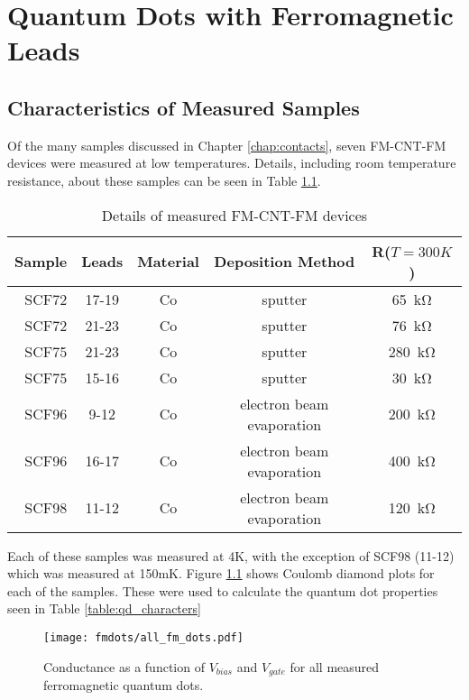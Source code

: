 \chapter{Quantum Dots with Ferromagnetic Leads}
\label{sec:FMCNTQD}

\section{Characteristics of Measured Samples}

Of the many samples discussed in Chapter \ref{chap:contacts}, seven FM-CNT-FM devices were measured at low temperatures. Details, including room temperature resistance, about these samples can be seen in Table \ref{table:fm_devices}.

\begin{table}
    \centering
    \caption{Details of measured FM-CNT-FM devices}
    \begin{tabular}{ r | c | c c c}
        Sample & Leads & Material & Deposition Method & R($T=300K$) \\ \hline
        SCF72 & 17-19 & Co & sputter & \SI{65}{\kilo\ohm} \\
        SCF72 & 21-23 & Co & sputter & \SI{76}{\kilo\ohm}\\
        SCF75 & 21-23 & Co & sputter & \SI{280}{\kilo\ohm}\\
        SCF75 & 15-16 & Co & sputter & \SI{30}{\kilo\ohm}\\
        SCF96 & 9-12  & Co & electron beam evaporation & \SI{200}{\kilo\ohm}\\
        SCF96 & 16-17 & Co & electron beam evaporation & \SI{400}{\kilo\ohm}\\
        SCF98 & 11-12 & Co & electron beam evaporation & \SI{120}{\kilo\ohm}\\
    \end{tabular}
    \label{table:fm_devices}  
\end{table}

Each of these samples was measured at 4K, with the exception of SCF98 (11-12) which was measured at 150mK. Figure \ref{fig:all_FM_CD} shows Coulomb diamond plots for each of the samples. These were used to calculate the quantum dot properties seen in Table \ref{table:qd_characters}

\begin{figure}
    \centering
    \texttt{[image: fmdots/all\_fm\_dots.pdf]}
    \caption{Conductance as a function of $V_{bias}$ and $V_{gate}$ for all measured ferromagnetic quantum dots.}
    \label{fig:all_FM_CD}
\end{figure}

